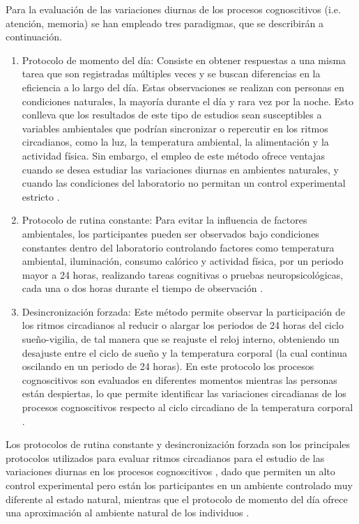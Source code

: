 \documentclass[12pt,letterpaper,final]{article}
\let\cite\cite %
\begin{document}
Para la evaluación de las variaciones diurnas de los procesos cognoscitivos (i.e. atención, memoria) se han empleado tres paradigmas, que se describirán a continuación.

\begin{enumerate}
	\item Protocolo de momento del día:
	Consiste en obtener respuestas a una misma tarea que son registradas múltiples veces y se buscan diferencias en la eficiencia a lo largo del día. Estas observaciones se realizan con personas en condiciones naturales, la mayoría durante el día y rara vez por la noche. Esto conlleva que los resultados de este tipo de estudios sean susceptibles a variables ambientales que podrían sincronizar o repercutir en los ritmos circadianos, como la luz, la temperatura ambiental,  la alimentación y la actividad física. Sin embargo, el empleo de este método ofrece ventajas cuando se desea estudiar las variaciones diurnas en ambientes naturales, y cuando las condiciones del laboratorio no permitan un control experimental estricto \cite{Blatter2007}.

	\item Protocolo de rutina constante:
	Para evitar la influencia de factores ambientales, los participantes pueden ser observados bajo condiciones constantes dentro del laboratorio controlando factores como temperatura ambiental, iluminación, consumo calórico y actividad física, por un periodo mayor a 24 horas, realizando tareas cognitivas o pruebas neuropsicológicas, cada una o dos horas durante el tiempo de observación \cite{Duffy2002}.

	\item Desincronización forzada:
	Este método permite observar la participación de los ritmos circadianos al reducir o alargar los periodos de 24 horas del ciclo sueño-vigilia, de tal manera que se reajuste el reloj interno, obteniendo un desajuste entre el ciclo de sueño y la temperatura corporal (la cual continua oscilando en un periodo de 24 horas). En este protocolo los procesos cognoscitivos  son evaluados en diferentes momentos mientras las personas están despiertas, lo que permite identificar las variaciones circadianas de los procesos cognoscitivos  respecto al ciclo circadiano de la temperatura corporal \cite{Hanneman2001}.
\end{enumerate}

Los protocolos de rutina constante y desincronización forzada son los principales protocolos utilizados para evaluar ritmos circadianos para el estudio de las variaciones diurnas en los procesos cognoscitivos , dado que permiten un alto   control experimental pero están los participantes en un ambiente controlado muy diferente al estado natural, mientras que el protocolo de momento del día ofrece una aproximación al ambiente natural  de los individuos \cite{Valdez2014}.
\end{document}
